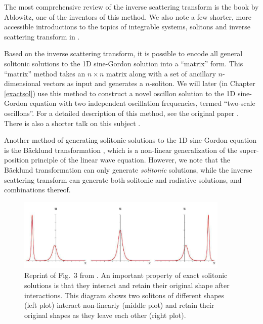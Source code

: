 \documentclass[11pt]{book}
\begin{document}
The most comprehensive review of the inverse scattering transform is the book \cite{ablowitz} by Ablowitz, one of the inventors of this method. We also note a few shorter, more accessible introductions to the topics of integrable systems, solitons and inverse scattering transform in \cite{Aktosun2009, spiro, intsys}.

Based on the inverse scattering transform, it is possible to encode all general solitonic solutions to the 1D sine-Gordon solution into a ``matrix'' form. This ``matrix'' method takes an $n\times n$ matrix along with a set of ancillary $n$-dimensional vectors as input and generates a $n$-soliton. We will later (in Chapter \ref{exactsol}) use this method to construct a novel oscillon solution to the 1D sine-Gordon equation with two independent oscillation frequencies, termed ``two-scale oscillons''. For a detailed description of this method, see the original paper \cite{:/content/aip/journal/jmp/51/12/10.1063/1.3520596}. There is also a shorter talk on this subject \cite{sgtalk}.

Another method of generating solitonic solutions to the 1D sine-Gordon equation is the B\"acklund transformation \cite{Dodd499, hietarinta1997introduction, Cuenda20111047}, which is a non-linear generalization of the super-position principle of the linear wave equation. However, we note that the B\"acklund transformation can only generate \emph{solitonic} solutions, while the inverse scattering transform can generate both solitonic and radiative solutions, and combinations thereof.

\begin{figure}\centering
  \includegraphics[width=0.9\textwidth]{plot/soliton-interaction.png}
  \caption{Reprint of Fig.~3 from \cite{2011PhyD..240.1378A}. An important property of exact solitonic solutions is that they interact and retain their original shape after interactions. This diagram shows two solitons of different shapes (left plot) interact non-linearly (middle plot) and retain their original shapes as they leave each other (right plot).}
  \label{interaction}
\end{figure}
\end{document}
